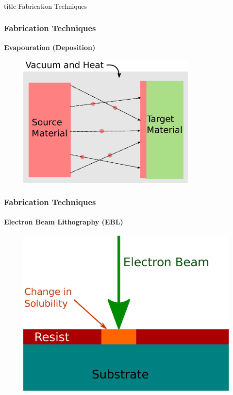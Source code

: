 \documentclass{beamer}
\begin{document}

\begin{frame}
    \vfill
    \centering
    \begin{beamercolorbox}[sep=8pt,center,shadow=true,rounded=true]{title}
        Fabrication Techniques
    \end{beamercolorbox}
    \vfill
\end{frame}


\begin{frame}
    \frametitle{Fabrication Techniques}
    \framesubtitle{Evapouration (Deposition)}
    \begin{figure}[!htb]
        \centering
        \includegraphics[width=0.8\textwidth]{img/evaporation.eps}
    \end{figure}
\end{frame}


\begin{frame}
    \frametitle{Fabrication Techniques}
    \framesubtitle{Electron Beam Lithography (EBL)}
    \begin{figure}[!htb]
        \centering
        \includegraphics[height=0.8\textheight]{img/ebeam.eps}
    \end{figure}
\end{frame}
\end{document}
